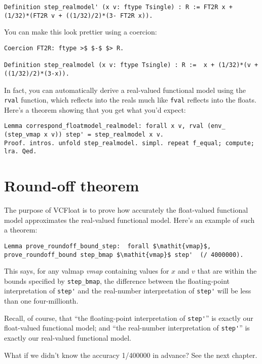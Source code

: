 \documentclass[article]{memoir}
\begin{document}
\begin{lstlisting}
Definition step_realmodel' (x v: ftype Tsingle) : R := FT2R x + (1/32)*(FT2R v + ((1/32)/2)*(3- FT2R x)).
\end{lstlisting}
You can make this look prettier using a coercion:

\begin{lstlisting}
Coercion FT2R: ftype >$ $-$ $> R.

Definition step_realmodel (x v: ftype Tsingle) : R :=  x + (1/32)*(v + ((1/32)/2)*(3-x)).
\end{lstlisting}

In fact, you can automatically derive a real-valued functional model
using the \lstinline{rval} function, which reflects into the reals
much like \lstinline{fval} reflects into the floats.  Here's
a theorem showing that you get what you'd expect:

\begin{lstlisting}
Lemma correspond_floatmodel_realmodel: forall x v, rval (env_ (step_vmap x v)) step' = step_realmodel x v.
Proof. intros. unfold step_realmodel. simpl. repeat f_equal; compute; lra. Qed. 
\end{lstlisting}

\chapter{Round-off theorem}
The purpose of VCFloat is to prove how accurately the
float-valued functional model approximates the real-valued
functional model.  Here's an example of such a theorem:
 
\begin{lstlisting}
Lemma prove_roundoff_bound_step:  forall $\mathit{vmap}$, prove_roundoff_bound step_bmap $\mathit{vmap}$ step'  (/ 4000000).
\end{lstlisting}
This says, for any valmap \emph{vmap}
containing values for $x$ and $v$
that are within the bounds specified by \lstinline{step_bmap},
the difference between the floating-point
interpretation of \lstinline{step'}
and the real-number interpretation of \lstinline{step'}
will be less than one four-millionth.

Recall, of course, that ``the floating-point interpretation of \lstinline{step'}'' is exactly our float-valued functional model;
and ``the real-number interpretation of \lstinline{step'}''
is exactly our real-valued functional model.

What if we didn't know the accuracy 1/400000 in advance?  See the
next chapter.
\end{document}
